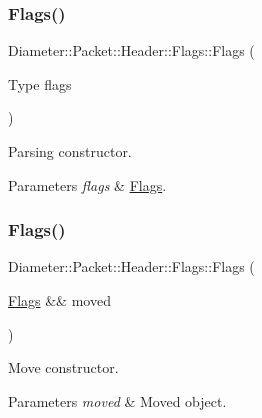 \subsubsection{\texorpdfstring{Flags()}{Flags()}\hspace{0.1cm}{\footnotesize\ttfamily [1/3]}}
{\footnotesize\ttfamily Diameter\+::\+Packet\+::\+Header\+::\+Flags\+::\+Flags (\begin{DoxyParamCaption}\item[{Type}]{flags }\end{DoxyParamCaption})\hspace{0.3cm}{\ttfamily [explicit]}}



Parsing constructor. 


\begin{DoxyParams}{Parameters}
{\em flags} & \hyperlink{classDiameter_1_1Packet_1_1Header_1_1Flags}{Flags}. \\
\hline
\end{DoxyParams}
\mbox{\label{classDiameter_1_1Packet_1_1Header_1_1Flags_aa6ebefbb36f446bd2ec91150a1a95319}} 
\subsubsection{\texorpdfstring{Flags()}{Flags()}\hspace{0.1cm}{\footnotesize\ttfamily [2/3]}}
{\footnotesize\ttfamily Diameter\+::\+Packet\+::\+Header\+::\+Flags\+::\+Flags (\begin{DoxyParamCaption}\item[{\hyperlink{classDiameter_1_1Packet_1_1Header_1_1Flags}{Flags} \&\&}]{moved }\end{DoxyParamCaption})\hspace{0.3cm}{\ttfamily [noexcept]}}



Move constructor. 


\begin{DoxyParams}{Parameters}
{\em moved} & Moved object. \\
\hline
\end{DoxyParams}
\mbox{\label{classDiameter_1_1Packet_1_1Header_1_1Flags_ac423d9923ebcafc66cd624e49b1cc674}} 
